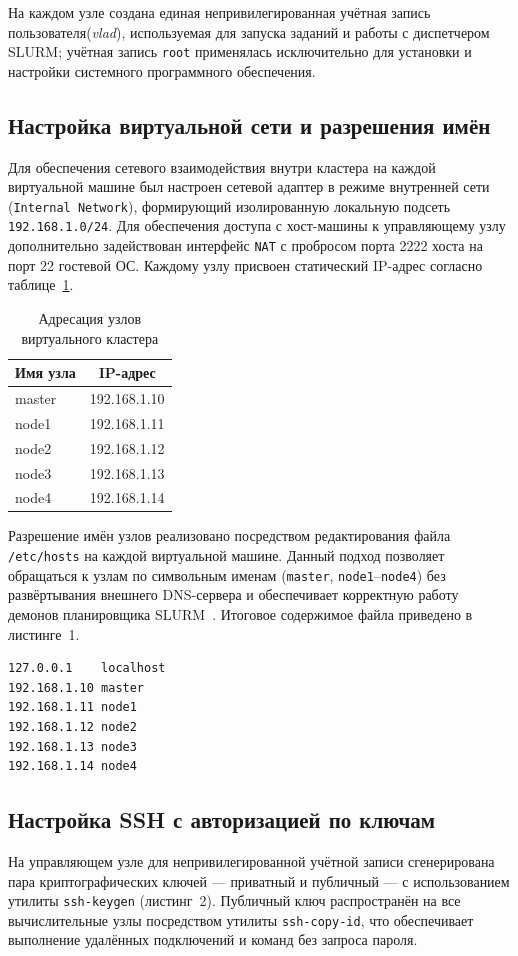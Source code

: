 На каждом узле создана единая непривилегированная учётная запись
пользователя(\textit{vlad}), используемая для запуска заданий и работы с диспетчером
SLURM; учётная запись \texttt{root} применялась исключительно для
установки и настройки системного программного обеспечения.

\subsection*{Настройка виртуальной сети и разрешения имён}
Для обеспечения сетевого взаимодействия внутри кластера на каждой
виртуальной машине был настроен сетевой адаптер в режиме внутренней
сети (\texttt{Internal Network}), формирующий изолированную локальную
подсеть \texttt{192.168.1.0/24}. Для обеспечения доступа с
хост-машины к управляющему узлу дополнительно задействован интерфейс
\texttt{NAT} с пробросом порта 2222 хоста на порт 22 гостевой ОС.
Каждому узлу присвоен статический IP-адрес согласно
таблице~\ref{tab:ip}.

\begin{table}[H]
\caption{Адресация узлов виртуального кластера}
\label{tab:ip}
\centering
\begin{tabular}{|l|c|}
\hline
Имя узла & IP-адрес \\
\hline
master & 192.168.1.10 \\
node1  & 192.168.1.11 \\
node2  & 192.168.1.12 \\
node3  & 192.168.1.13 \\
node4  & 192.168.1.14 \\
\hline
\end{tabular}
\end{table}

Разрешение имён узлов реализовано посредством редактирования файла
\texttt{/etc/hosts} на каждой виртуальной машине. Данный подход
позволяет обращаться к узлам по символьным именам
(\texttt{master}, \texttt{node1}--\texttt{node4}) без развёртывания
внешнего DNS-сервера и обеспечивает корректную работу демонов
планировщика SLURM~\cite{schedmd2024slurm}. Итоговое содержимое файла приведено в
листинге~1.

\begin{lstlisting}[caption={Содержимое файла /etc/hosts}]
127.0.0.1    localhost
192.168.1.10 master
192.168.1.11 node1
192.168.1.12 node2
192.168.1.13 node3
192.168.1.14 node4
\end{lstlisting}

\subsection*{Настройка SSH с авторизацией по ключам}
На управляющем узле для непривилегированной учётной записи
сгенерирована пара криптографических ключей --- приватный и
публичный --- с использованием утилиты \texttt{ssh-keygen}
(листинг~2). Публичный ключ распространён на все вычислительные
узлы посредством утилиты \texttt{ssh-copy-id}, что обеспечивает
выполнение удалённых подключений и команд без запроса пароля.

